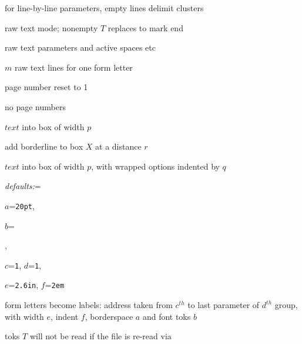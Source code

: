 {{%
  {for line-by-line parameters, empty lines delimit clusters}

\hruler {}

%
  {raw text mode; nonempty $T$ replaces {\tt\string\endrawblockmode}
   to mark end}


%
  {raw text parameters and active spaces etc}

%
  {$m$ raw text lines for one form letter}


\hruler


%
  {page number reset to 1}


\entry{{\tt\string\NOPAGENUMBERS}}%
  {no page numbers}


%
  {$text$ into box of width $p$}


%
  {add borderline to box $X$ at a distance $r$}


%
  {$text$ into box of width $p$, with wrapped options indented
by $q$}


\hruler

%
 {\strut\par{\sl defaults:}\everypar={\hbox{\ \ \ }}\par\par
  $a$={\tt 20pt}, \par $b$={\tt\string\tt\string\raggedright},
 \par $c$={\tt1}, $d$={\tt1}, \par
  $e$={\tt2.6in},  $f$={\tt2em}}%
 {form letters become labels: address taken from $c^{th}$ to
last parameter of $d^{th}$ group, with width $e$, indent
$f$, borderspace $a$ and font toks $b$}

\hruler


%
  {toks $T$ will not be read if the file is re-read via {\tt
   \string{}}}


}}
